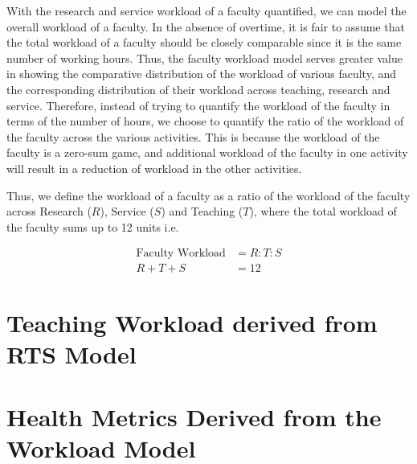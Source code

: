 With the research and service workload of a faculty quantified, we can model the overall workload of a faculty. In the absence of overtime, it is fair to assume that the total workload of a faculty should be closely comparable since it is the same number of working hours. Thus, the faculty workload model serves greater value in showing the comparative distribution of the workload of various faculty, and the corresponding distribution of their workload across teaching, research and service. Therefore, instead of trying to quantify the workload of the faculty in terms of the number of hours, we choose to quantify the ratio of the workload of the faculty across the various activities. This is because the workload of the faculty is a zero-sum game, and additional workload of the faculty in one activity will result in a reduction of workload in the other activities.

Thus, we define the workload of a faculty as a ratio of the workload of the faculty across Research ($R$), Service ($S$) and Teaching ($T$), where the total workload of the faculty sums up to 12 units i.e.

\begin{equation*}
      \begin{aligned}
            \text{Faculty Workload} & = R:T:S \\
            R + T + S               & = 12
      \end{aligned}
\end{equation*}



\section{Teaching Workload derived from RTS Model}



\section{Health Metrics Derived from the Workload Model}
